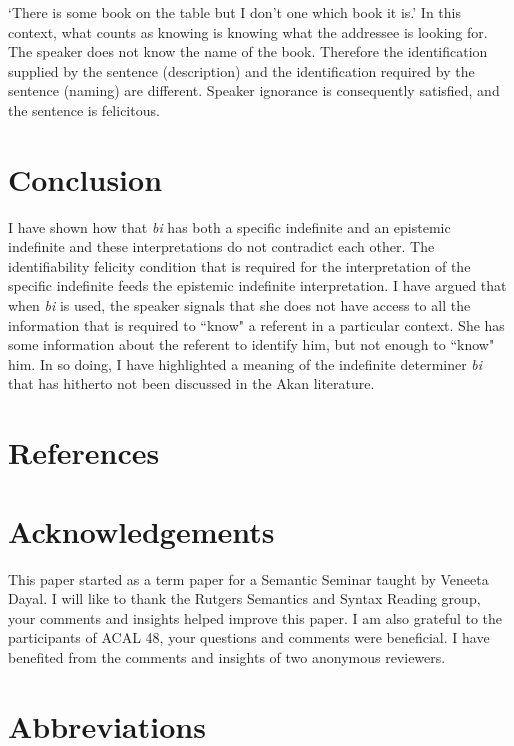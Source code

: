 \documentclass[output=paper,modfonts,nonflat,draftmode]{langsci/langscibook}
\begin{document}
\glt `There is some book on the table but I don't one which book it is.'
\z In this context, what counts as knowing is knowing what the addressee is looking for. The speaker does not know the name of the book. Therefore the identification supplied by the sentence (description) and the identification required by the sentence (naming) are different. Speaker ignorance is consequently satisfied, and the sentence is felicitous. 

\section{Conclusion}\label{sec:owusu:5}

I have shown how that \emph{bi} has both a  specific indefinite and an epistemic indefinite and these interpretations do not contradict each other. The identifiability felicity condition that is required for the interpretation of the specific indefinite feeds the epistemic indefinite interpretation. I have argued that when \emph{bi} is used, the speaker signals that she does not have access to all the information that is required to ``know" a referent in a particular context. She has some information about the referent to identify him, but not enough to ``know" him. In so doing, I have highlighted a meaning of the indefinite determiner \emph{bi} that has hitherto not been discussed in the Akan literature. 
 


\section*{References}


\section*{Acknowledgements}
This paper started as a term paper for a Semantic Seminar taught by Veneeta Dayal. I will like to thank the Rutgers Semantics and Syntax Reading group, your comments and insights helped improve this paper. I am also grateful to the participants of  ACAL 48, your questions and comments were beneficial. I have benefited from the comments and insights of two anonymous reviewers. 


\section*{Abbreviations}
\end{document}
